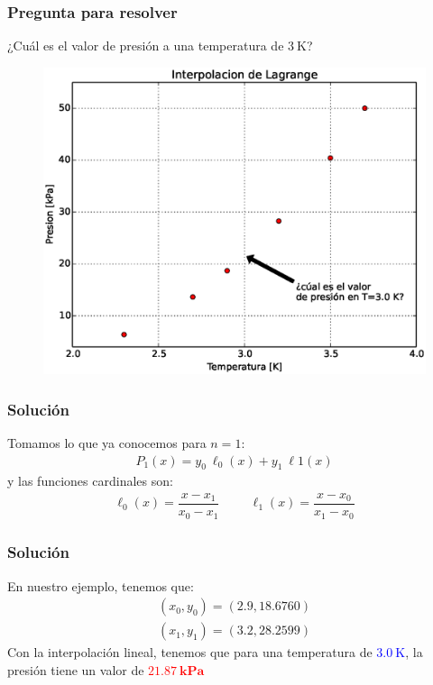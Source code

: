 \documentclass[12pt]{beamer}
\begin{document}
\begin{frame}
\frametitle{Pregunta para resolver}
¿Cuál es el valor de presión a una temperatura de $\SI{3}{\kelvin}$?
\begin{figure}
	\centering
	\includegraphics[scale=0.4]{Imagenes/grafica03.eps} 
\end{figure}
\end{frame}
\begin{frame}[fragile]
\frametitle{Solución}
Tomamos lo que ya conocemos para $n = 1$:
\pause
\begin{align*}
P_{1} (x) = y_{0} \: \ell_{0} (x) + y_{1} \: \ell{1} (x)
\end{align*}
\pause
y las funciones cardinales son:
\pause
\begin{align*}
\ell_{0} (x) = \dfrac{x - x_{1}}{x_{0} - x_{1}} \hspace{1cm} \ell_{1} (x) = \dfrac{x - x_{0}}{x_{1} - x_{0}}
\end{align*}
\end{frame}
\begin{frame}[fragile]
\frametitle{Solución}
En nuestro ejemplo, tenemos que:
\pause
\begin{align*}
(x_{0}, y_{0}) = (2.9, 18.6760) \\[1em]
(x_{1}, y_{1}) = (3.2, 28.2599)
\end{align*}
\pause
Con la interpolación lineal, tenemos que para una temperatura de \textcolor{blue}{$\SI{3.0}{\kelvin}$}, la presión tiene un valor de \textcolor{red}{$\mathbf{\SI{21.87}{\kilo\pascal}}$}
\end{frame}
\end{document}
